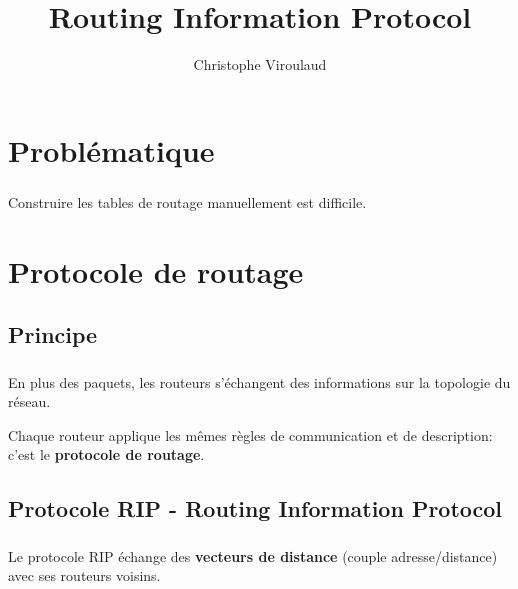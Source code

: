 \documentclass[svgnames,11pt]{beamer}
\author[]{Christophe Viroulaud}
\title{Routing Information Protocol}
\date{}
\institute{Terminale NSI}
\begin{document}
\begin{frame}
    \titlepage
    \end{frame}

\section{Problématique}
\begin{frame}
    \frametitle{}
    Construire les tables de routage manuellement est difficile.
    \begin{center}
    \end{center}

\end{frame}

\section{Protocole de routage}
\subsection{Principe}

\begin{frame}
    \frametitle{}

    En plus des paquets, les routeurs s'échangent des informations sur la topologie du réseau.
    \begin{aretenir}[]
        Chaque routeur applique les mêmes règles de communication et de description: c'est le \textbf{protocole de routage}.
    \end{aretenir}

\end{frame}

\subsection{Protocole RIP - Routing Information Protocol}
\begin{frame}
    \frametitle{}

    \begin{aretenir}[]
        Le protocole RIP échange des \textbf{vecteurs de distance} (couple adresse/distance) avec ses routeurs voisins.
    \end{aretenir}
\end{frame}
\end{document}
